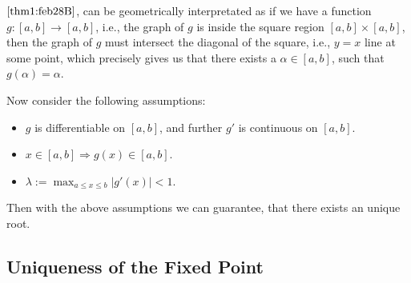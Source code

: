  $\ref{thm1:feb28B}$, can be geometrically interpretated as if we have a function $g :[a,b] \to [a,b]$, i.e., the graph of $g$ is inside the square region $[a,b] \times [a,b]$, then the graph of $g$ must intersect the diagonal of the square, i.e., $y = x$ line at some point, which precisely gives us that there exists a $\alpha \in [a,b]$, such that $g(\alpha) = \alpha$.

\begin{defn}\label{def1:feb28B}
    Now consider the following assumptions: 

        \begin{itemize}
            \item $g$ is differentiable on $[a,b]$, and further $g'$ is continuous on $[a,b]$.
            
            \item $x \in [a,b] \Rightarrow g(x) \in [a,b]$.
            
            \item $\displaystyle{\lambda := \max_{a \leq x \leq b} |g'(x)| < 1}$.
        \end{itemize}    
\end{defn}
Then with the above assumptions we can guarantee, that there exists an unique root.

\subsection{Uniqueness of the Fixed Point}

